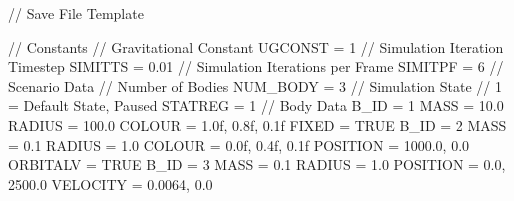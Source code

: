 // Save File Template

// Constants
// Gravitational Constant
UGCONST = 1
// Simulation Iteration Timestep
SIMITTS = 0.01
// Simulation Iterations per Frame
SIMITPF = 6
// Scenario Data
// Number of Bodies
NUM_BODY = 3
// Simulation State
// 1 = Default State, Paused
STATREG = 1
// Body Data
B_ID = 1 {
  MASS     = 10.0
  RADIUS   = 100.0
  COLOUR   = 1.0f, 0.8f, 0.1f
  FIXED    = TRUE
}
B_ID = 2 {
  MASS     = 0.1
  RADIUS   = 1.0
  COLOUR   = 0.0f, 0.4f, 0.1f
  POSITION = 1000.0, 0.0
  ORBITALV = TRUE
}
B_ID = 3 {
  MASS     = 0.1
  RADIUS   = 1.0
  POSITION = 0.0, 2500.0
  VELOCITY = 0.0064, 0.0
}